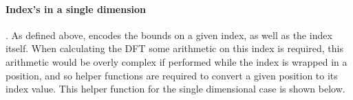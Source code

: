 \begin{code}[hide]
\AgdaSymbol{;}\AgdaSpace{}%
\AgdaSymbol{;}\AgdaSpace{}%
\AgdaSymbol{;}\AgdaSpace{}%
\AgdaSymbol{)}\<%
\\
%
\>[2]\AgdaSpace{}%
\AgdaSpace{}%
\AgdaSpace{}%
\AgdaSpace{}%
\AgdaSymbol{(}\AgdaSymbol{;}\AgdaSpace{}%
\AgdaSymbol{;}\AgdaSpace{}%
\AgdaSymbol{;}\AgdaSpace{}%
\AgdaSymbol{;}\AgdaSpace{}%
\AgdaSymbol{;}\AgdaSpace{}%
\AgdaSymbol{)}\<%
\\
%
\\[\AgdaEmptyExtraSkip]%
%
\>[2]\<%
\\
\>[2][@{}l@{\AgdaIndent{0}}]%
\>[4]\<%
\\
\>[4][@{}l@{\AgdaIndent{0}}]%
\>[6]\AgdaSpace{}%
\AgdaSymbol{:}\AgdaSpace{}%
\<%
\\
%
\>[6]\AgdaSpace{}%
\AgdaSpace{}%
\AgdaSymbol{:}\AgdaSpace{}%
\<%
\\
%
\\[\AgdaEmptyExtraSkip]%
%
\>[2]\AgdaComment{------------------------------------}\<%
\\
%
\>[2]\<%
\\
%
\>[2]\AgdaComment{------------------------------------}\<%
\end{code}

\paragraph{Index's in a single dimension}. As defined above,  encodes 
the bounds on a given index, as well as the index itself. 
When calculating the DFT some arithmetic on this index is required,
this arithmetic would be overly complex if performed while the index is 
wrapped in a position, and so
helper functions are required to convert a given position to its index value.
This helper function for the single dimensional case is shown below.

